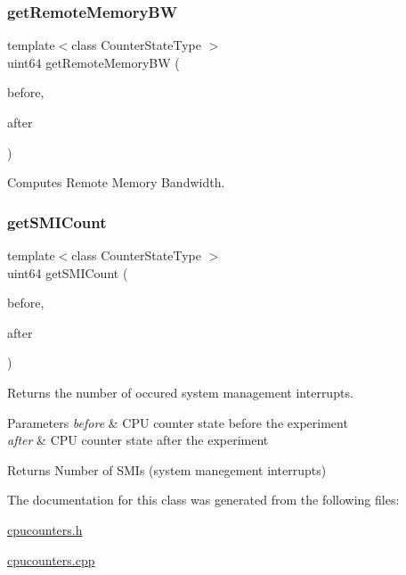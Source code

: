 \subsubsection{\texorpdfstring{get\+Remote\+Memory\+BW}{getRemoteMemoryBW}}
{\footnotesize\ttfamily template$<$class Counter\+State\+Type $>$ \\
uint64 get\+Remote\+Memory\+BW (\begin{DoxyParamCaption}\item[{const Counter\+State\+Type \&}]{before,  }\item[{const Counter\+State\+Type \&}]{after }\end{DoxyParamCaption})\hspace{0.3cm}{\ttfamily [friend]}}



Computes Remote Memory Bandwidth. 

\mbox{\label{class_basic_counter_state_a5e245473e2297272a50ca054b33c8c86}} 
\subsubsection{\texorpdfstring{get\+S\+M\+I\+Count}{getSMICount}}
{\footnotesize\ttfamily template$<$class Counter\+State\+Type $>$ \\
uint64 get\+S\+M\+I\+Count (\begin{DoxyParamCaption}\item[{const Counter\+State\+Type \&}]{before,  }\item[{const Counter\+State\+Type \&}]{after }\end{DoxyParamCaption})\hspace{0.3cm}{\ttfamily [friend]}}



Returns the number of occured system management interrupts. 


\begin{DoxyParams}{Parameters}
{\em before} & C\+PU counter state before the experiment \\
\hline
{\em after} & C\+PU counter state after the experiment \\
\hline
\end{DoxyParams}
\begin{DoxyReturn}{Returns}
Number of S\+M\+Is (system manegement interrupts) 
\end{DoxyReturn}


The documentation for this class was generated from the following files\+:\begin{DoxyCompactItemize}
\item 
\mbox{\hyperlink{cpucounters_8h}{cpucounters.\+h}}\item 
\mbox{\hyperlink{cpucounters_8cpp}{cpucounters.\+cpp}}\end{DoxyCompactItemize}

